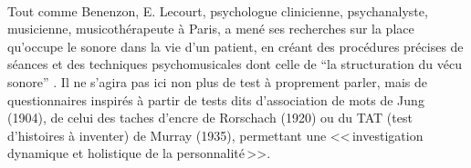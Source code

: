         \\
Tout comme Benenzon, E. Lecourt, psychologue clinicienne,
psychanalyste, musicienne, musicothérapeute à Paris, 
a mené ses recherches sur la place qu'occupe le sonore dans la vie d'un
patient, en créant des procédures précises de séances et des techniques psychomusicales dont celle de 
\enquote{la structuration du vécu sonore} \autocite[119] {lecourt_les_2017}.
Il ne s'agira pas ici non plus de test à proprement parler, mais de questionnaires inspirés à partir de tests dits
d'association de mots de Jung (1904), de celui des taches
d'encre de Rorschach (1920) ou du TAT (test d'histoires à
inventer) de Murray (1935), permettant une <<\,investigation dynamique et holistique de la
      personnalité\,>>\autocite[13] {anzieu.chabert:methodes}.

